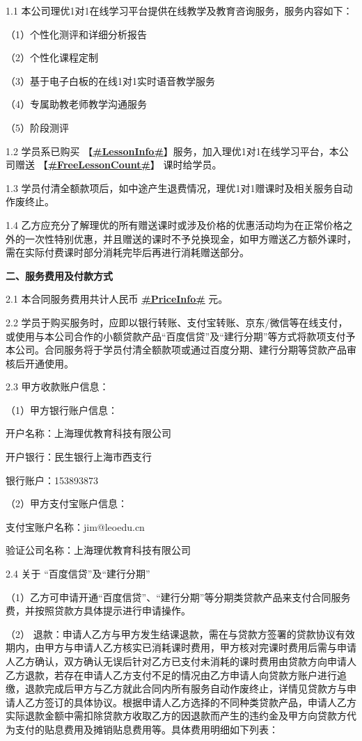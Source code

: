 \documentclass {ctexart}
\begin{document}
1.1	本公司理优1对1在线学习平台提供在线教学及教育咨询服务，服务内容如下：

（1）个性化测评和详细分析报告	

（2）个性化课程定制

（3）基于电子白板的在线1对1实时语音教学服务	

（4）专属助教老师教学沟通服务

（5）阶段测评

1.2	学员系已购买 【\underline{\textbf{#LessonInfo#}}】服务，加入理优1对1在线学习平台，本公司赠送    【\underline{\textbf{#FreeLessonCount#}}】  课时给学员。

1.3	学员付清全额款项后，如中途产生退费情况，理优1对1赠课时及相关服务自动作废终止。

1.4	乙方应充分了解理优的所有赠送课时或涉及价格的优惠活动均为在正常价格之外的一次性特别优惠，并且赠送的课时不予兑换现金，如甲方赠送乙方额外课时，需在实际付费课时部分消耗完毕后再进行消耗赠送部分。


\newpage
\textbf{二、服务费用及付款方式}

2.1	本合同服务费用共计人民币 \textbf{\underline{#PriceInfo#}} 元。

2.2	学员于购买服务时，应即以银行转账、支付宝转账、京东/微信等在线支付，或使用与本公司合作的小额贷款产品“百度信贷”及“建行分期”等方式将款项支付予本公司。合同服务将于学员付清全额款项或通过百度分期、建行分期等贷款产品审核后开通使用。

2.3	甲方收款账户信息：

（1）甲方银行账户信息：

开户名称：上海理优教育科技有限公司

开户银行：民生银行上海市西支行

银行账户：153893873

（2）甲方支付宝账户信息：

支付宝账户名称：jim@leoedu.cn

验证公司名称：上海理优教育科技有限公司

2.4	关于 “百度信贷”及“建行分期”

（1）乙方可申请开通“百度信贷”、“建行分期”等分期类贷款产品来支付合同服务费，并按照贷款方具体提示进行申请操作。

（2） 退款：申请人乙方与甲方发生结课退款，需在与贷款方签署的贷款协议有效期内，由甲方与申请人乙方核实已消耗课时费用，甲方核对完课时费用后需与申请人乙方确认，双方确认无误后针对乙方已支付未消耗的课时费用由贷款方向申请人乙方退款，若存在申请人乙方支付不足的情况由乙方申请人向贷款方账户进行追缴，退款完成后甲方与乙方就此合同内所有服务自动作废终止，详情见贷款方与申请人乙方签订的具体协议。根据申请人乙方选择的不同种类贷款产品，申请人乙方实际退款金额中需扣除贷款方收取乙方的因退款而产生的违约金及甲方向贷款方代为支付的贴息费用及摊销贴息费用等。具体费用明细如下列表：
\end{document}

